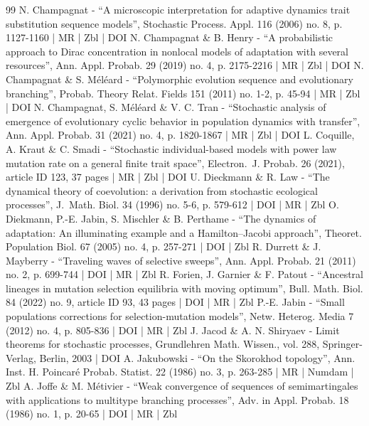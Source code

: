 \documentclass[10pt]{amsart}
\theoremstyle{plain}
\theoremstyle{remark}
\begin{document}
\begin{thebibliography}{99}
N. Champagnat - “A microscopic interpretation for adaptive dynamics trait substitution sequence models”, Stochastic Process. Appl. 116 (2006) no. 8, p. 1127-1160 | MR | Zbl | DOI
N. Champagnat \& B. Henry - “A probabilistic approach to Dirac concentration in nonlocal models of adaptation with several resources”, Ann. Appl. Probab. 29 (2019) no. 4, p. 2175-2216 | MR | Zbl | DOI
N. Champagnat \& S. Méléard - “Polymorphic evolution sequence and evolutionary branching”, Probab. Theory Relat. Fields 151 (2011) no. 1-2, p. 45-94 | MR | Zbl | DOI
N. Champagnat, S. Méléard \& V. C. Tran - “Stochastic analysis of emergence of evolutionary cyclic behavior in population dynamics with transfer”, Ann. Appl. Probab. 31 (2021) no. 4, p. 1820-1867 | MR | Zbl | DOI
L. Coquille, A. Kraut \& C. Smadi - “Stochastic individual-based models with power law mutation rate on a general finite trait space”, Electron. J. Probab. 26 (2021), article ID 123, 37 pages | MR | Zbl | DOI
U. Dieckmann \& R. Law - “The dynamical theory of coevolution: a derivation from stochastic ecological processes”, J. Math. Biol. 34 (1996) no. 5-6, p. 579-612 | DOI | MR | Zbl
O. Diekmann, P.-E. Jabin, S. Mischler \& B. Perthame - “The dynamics of adaptation: An illuminating example and a Hamilton–Jacobi approach”, Theoret. Population Biol. 67 (2005) no. 4, p. 257-271 | DOI | Zbl
R. Durrett \& J. Mayberry - “Traveling waves of selective sweeps”, Ann. Appl. Probab. 21 (2011) no. 2, p. 699-744 | DOI | MR | Zbl
R. Forien, J. Garnier \& F. Patout - “Ancestral lineages in mutation selection equilibria with moving optimum”, Bull. Math. Biol. 84 (2022) no. 9, article ID 93, 43 pages | DOI | MR | Zbl
P.-E. Jabin - “Small populations corrections for selection-mutation models”, Netw. Heterog. Media 7 (2012) no. 4, p. 805-836 | DOI | MR | Zbl
J. Jacod \& A. N. Shiryaev - Limit theorems for stochastic processes, Grundlehren Math. Wissen., vol. 288, Springer-Verlag, Berlin, 2003 | DOI
A. Jakubowski - “On the Skorokhod topology”, Ann. Inst. H. Poincaré Probab. Statist. 22 (1986) no. 3, p. 263-285 | MR | Numdam | Zbl
A. Joffe \& M. Métivier - “Weak convergence of sequences of semimartingales with applications to multitype branching processes”, Adv. in Appl. Probab. 18 (1986) no. 1, p. 20-65 | DOI | MR | Zbl

\end{thebibliography}
\end{document}
